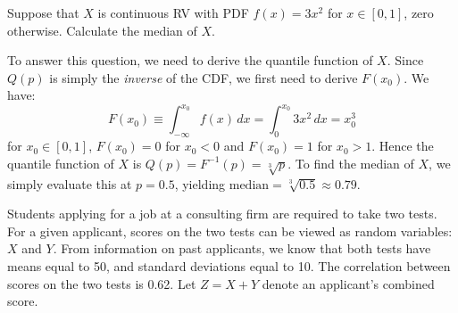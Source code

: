 \documentclass[addpoints,12pt]{exam}\usepackage[]{graphicx}\usepackage[]{xcolor}
\begin{document}
\begin{questions}
\question Suppose that $X$ is continuous RV with PDF $f(x) = 3x^2$ for $x \in [0,1]$, zero otherwise.
  Calculate the median of $X$.
  \begin{solution}
    To answer this question, we need to derive the quantile function of $X$.
    Since $Q(p)$ is simply the \emph{inverse} of the CDF, we first need to derive $F(x_0)$.
    We have:
    \[
      F(x_0) \equiv \int_{-\infty}^{x_0} f(x) \,dx = \int_{0}^{x_0} 3x^2\, dx = x_0^3
    \]
    for $x_0 \in [0,1]$, $F(x_0) = 0$ for $x_0 < 0$ and $F(x_0) = 1$ for $x_0 > 1$.
    Hence the quantile function of $X$ is $Q(p) = F^{-1}(p) = \sqrt[3]{p}$.
    To find the median of $X$, we simply evaluate this at $p = 0.5$, yielding $\text{median} = \sqrt[3]{0.5} \approx 0.79$.
  \end{solution}


  \question Students applying for a job at a consulting firm are required to take two tests. 
  For a given applicant, scores on the two tests can be viewed as random variables: $X$ and $Y$. 
  From information on past applicants, we know that both tests have means equal to 50, and standard deviations equal to 10.
  The correlation between scores on the two tests is 0.62.
  Let $Z = X + Y$ denote an applicant's combined score.
\end{questions}
\end{document}
